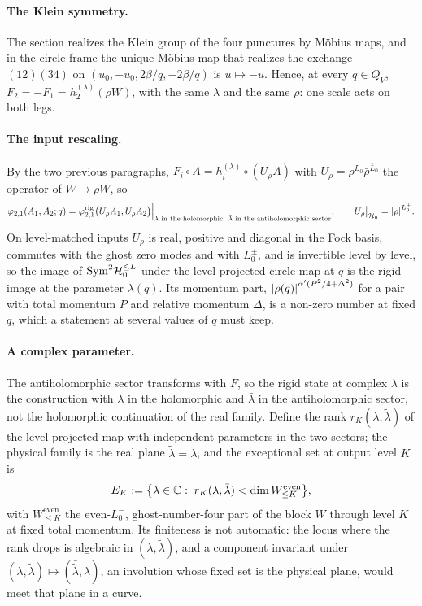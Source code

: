 \paragraph{The Klein symmetry.}
The section realizes the Klein group of the four punctures by Möbius maps, and in the circle frame the unique Möbius map that realizes the exchange $(12)(34)$ on $(u_0, - u_0, 2 \beta / q, - 2 \beta / q)$ is $u \mapsto - u$.
Hence, at every $q \in Q_V$, $F_2 = - F_1 = h_2^{(\lambda)}(\rho W)$, with the same $\lambda$ and the same $\rho$: one scale acts on both legs.

\paragraph{The input rescaling.}
By the two previous paragraphs, $F_i \circ A = h_i^{(\lambda)} \circ (U_\rho A)$ with $U_\rho = \rho^{L_0} \bar\rho^{\bar L_0}$ the operator of $W \mapsto \rho W$, so
\begin{equation}
  \label{eq:wscircle:rigid-reduction}
  \varphi_{2,1}(A_1, A_2; q)
    = \varphi^{\mathrm{rig}}_{2,1} \big( U_\rho A_1, U_\rho A_2 \big) \Big|_{\lambda \text{ in the holomorphic}, \ \bar\lambda \text{ in the antiholomorphic sector}},
  \qquad
  U_\rho \big|_{\mathcal{H}_0}
    = {|\rho|}^{L_0^+}.
\end{equation}
On level-matched inputs $U_\rho$ is real, positive and diagonal in the Fock basis, commutes with the ghost zero modes and with $L_0^\pm$, and is invertible level by level, so the image of $\mathrm{Sym}^2 \mathcal{H}_0^{\leq L}$ under the level-projected circle map at $q$ is the rigid image at the parameter $\lambda(q)$.
Its momentum part, ${|\rho(q)|}^{\alpha' (P^2 / 4 + \Delta^2)}$ for a pair with total momentum $P$ and relative momentum $\Delta$, is a non-zero number at fixed $q$, which a statement at several values of $q$ must keep.

\paragraph{A complex parameter.}
The antiholomorphic sector transforms with $\bar F$, so the rigid state at complex $\lambda$ is the construction with $\lambda$ in the holomorphic and $\bar\lambda$ in the antiholomorphic sector, not the holomorphic continuation of the real family.
Define the rank $r_K(\lambda, \tilde\lambda)$ of the level-projected map with independent parameters in the two sectors; the physical family is the real plane $\tilde\lambda = \bar\lambda$, and the exceptional set at output level $K$ is
\begin{equation}
  E_K
    := \big\{ \lambda \in \mathbb{C} : \; r_K(\lambda, \bar\lambda) < \dim W^{\mathrm{even}}_{\leq K} \big\},
\end{equation}
with $W^{\mathrm{even}}_{\leq K}$ the even-$L_0^-$, ghost-number-four part of the block $W$ through level $K$ at fixed total momentum.
Its finiteness is not automatic: the locus where the rank drops is algebraic in $(\lambda, \tilde\lambda)$, and a component invariant under $(\lambda, \tilde\lambda) \mapsto (\bar{\tilde\lambda}, \bar\lambda)$, an involution whose fixed set is the physical plane, would meet that plane in a curve.

